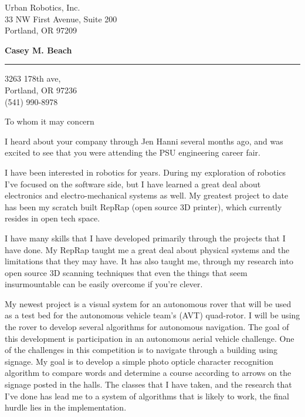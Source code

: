 \documentclass{letter} %
\begin{document}
\signature{Casey M. Beach}           %
\longindentation=0pt                       %
\let\raggedleft\raggedright                %
 
 
\begin{letter}{Urban Robotics, Inc. \\
33 NW First Avenue, Suite 200 \\
Portland, OR 97209 }

\begin{center}
{\large\bf Casey M. Beach}
\end{center}
\medskip\hrule height 1pt
\begin{center}
 3263 178th ave,\\
Portland, OR 97236 \\
(541) 990-8978 
\end{center} 
\vfill %

 
\opening{To whom it may concern} 
\begin{flushleft} 
\noindent I heard about your company through Jen Hanni several months ago, and was excited to see that you were attending the 
PSU engineering career fair.


\noindent I have been interested in robotics for years.  During my exploration of robotics I've focused on 
the software side, but I have learned a great deal about electronics and electro-mechanical systems as well.  
My greatest project to date has been my scratch built RepRap (open source 3D printer), which currently resides in open 
tech space.

\noindent I have many skills that I have developed primarily through the projects that I have done.  My RepRap taught me
a great deal about physical systems and the limitations that they may have.  It has also taught me, through my research into
open source 3D scanning techniques that even the things that seem insurmountable can be easily overcome if you're clever.

\noindent My newest project is a visual system for an autonomous rover that will be used as a test bed for the autonomous vehicle team's (AVT)
quad-rotor.  I will be using the rover to develop several algorithms for autonomous navigation.  The goal of this development
is participation in an autonomous aerial vehicle challenge.  One of the challenges in this competition is to navigate
through a building using signage.  My goal is to develop a simple photo opticle character recognition algorithm to 
compare words and determine a course according to arrows on the signage posted in the halls.  The classes that I have taken,
and the research that I've done has lead me to a system of algorithms that is likely to work, the final hurdle lies in the 
implementation.


\end{flushleft}
\end{letter}
\end{document}
